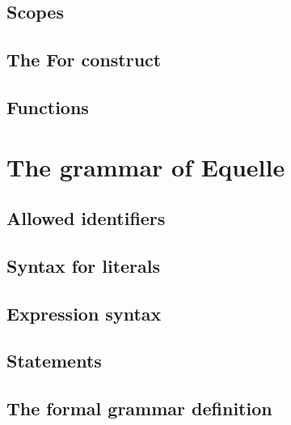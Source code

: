 \documentclass[11pt]{article}
\begin{document}
\subsection{Scopes}

\subsection{The For construct}

\subsection{Functions}


\section{The grammar of Equelle}

\subsection{Allowed identifiers}

\subsection{Syntax for literals}

\subsection{Expression syntax}

\subsection{Statements}

\subsection{The formal grammar definition}



\end{document}
